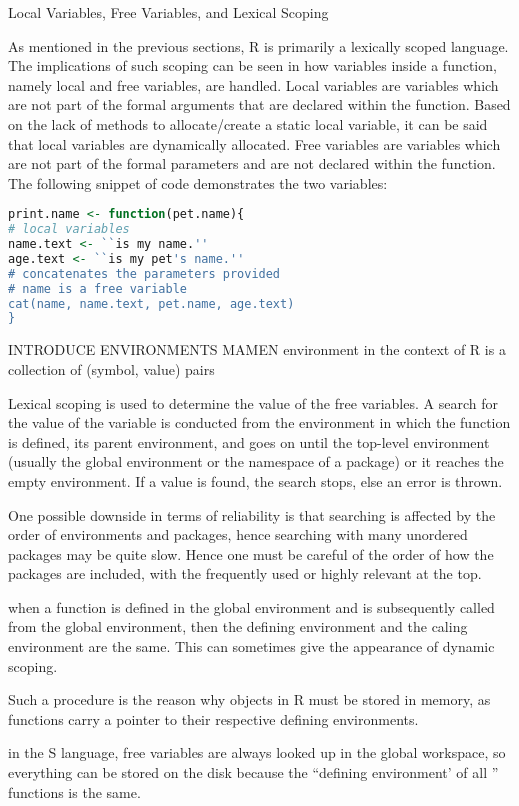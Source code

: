 \documentclass[12pt]{article}
\begin{document}
Local Variables, Free Variables, and Lexical Scoping

As mentioned in the previous sections, R is primarily a lexically scoped language. The implications of such scoping can be seen in how variables inside a function, namely local and free variables, are handled. Local variables are variables which are not part of the formal arguments that are declared within the function. Based on the lack of methods to allocate/create a static local variable, it can be said that local variables are dynamically allocated. Free variables are variables which are not part of the formal parameters and are not declared within the function. The following snippet of code demonstrates the two variables:

\begin{lstlisting}[language=R]
print.name <- function(pet.name){
# local variables
name.text <- ``is my name.''
age.text <- ``is my pet's name.''
# concatenates the parameters provided
# name is a free variable
cat(name, name.text, pet.name, age.text)
}
\end{lstlisting}

INTRODUCE ENVIRONMENTS MAMEN
environment in the context of R is a collection of (symbol, value) pairs

Lexical scoping is used to determine the value of the free variables. A search for the value of the variable is conducted from the environment in which the function is defined, its parent environment, and goes on until the top-level environment (usually the global environment or the namespace of a package) or it reaches the empty environment. If a value is found, the search stops, else an error is thrown.

One possible downside in terms of reliability is that searching is affected by the order of environments and packages, hence searching with many unordered packages may be quite slow. Hence one must be careful of the order of how the packages are included, with the frequently used or highly relevant at the top.

when a function is defined in the global environment and is subsequently called from the global environment, then the defining environment and the caling environment are the same. This can sometimes give the appearance of dynamic scoping.

Such a procedure is the reason why objects in R must be stored in memory, as functions carry a pointer to their respective defining environments.

in the S language, free variables are always looked up in the global workspace, so everything can be stored on the disk because the ``defining environment' of all '' functions is the same.
\end{document}
